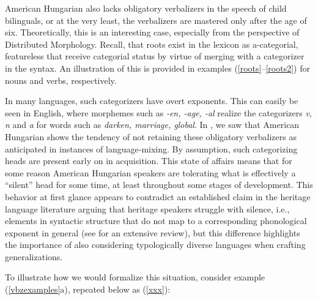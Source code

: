 \documentclass[output=paper,colorlinks,citecolor=brown,footheight=42pt]{langscibook}
\begin{document}
American Hungarian also lacks obligatory verbalizers in the speech of child bilinguals, or at the very least, the verbalizers are mastered only after the age of six. Theoretically, this is an interesting case, especially from the perspective of Distributed Morphology. Recall, that roots exist in the lexicon as a-categorial, featureless that receive categorial status by virtue of merging with a categorizer in the syntax. An illustration of this is provided in examples (\ref{roots}--\ref{roots2}) for nouns and verbs, respectively.

\begin{multicols}{2}

\begin{exe}
\ex \label{roots}
\end{exe}

\columnbreak

\begin{exe}
\ex \label{roots2}
\end{exe}

\end{multicols}


In many languages, such categorizers have overt exponents. This can easily be seen in English, where morphemes such as {\itshape -en, -age, -al} realize the categorizers {\itshape v, n} and {\itshape a} for words such as {\itshape darken, marriage, global}. In , we saw that American Hungarian shows the tendency of not retaining these obligatory verbalizers as anticipated in instances of language-mixing. By assumption, such categorizing heads are present early on in acquisition. This state of affairs means that for some reason American Hungarian speakers are tolerating what is effectively a “silent” head for some time, at least throughout some stages of development. This behavior at first glance appears to contradict an established claim in the heritage language literature arguing that heritage speakers struggle with silence, i.e., elements in syntactic structure that do not map to a corresponding phonological exponent in general (see \citet{polinsky2018heritage} for an extensive review), but this difference highlights the importance of also considering typologically diverse languages when crafting generalizations.

To illustrate how we would formalize this situation, consider example (\ref{vbzexamples}a), repeated below as (\ref{xxx}):
\end{document}
